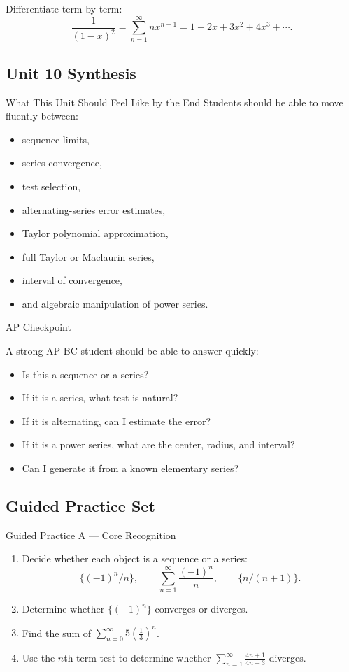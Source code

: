 \documentclass[11pt]{article}
\newcommand{\solution}{\noindent{\textbf{Solution.}}}
\newcommand{\apcheckpoint}[1]{%
\begin{skillbox}{AP Checkpoint}
#1
\end{skillbox}
}
\begin{document}
\solution
Differentiate term by term:
\[
\frac{1}{(1-x)^2}
=
\sum_{n=1}^{\infty}n x^{n-1}
=
1+2x+3x^2+4x^3+\cdots.
\]

\newpage
\subsection{Unit 10 Synthesis}

\begin{theorybox}{What This Unit Should Feel Like by the End}
Students should be able to move fluently between:
\begin{itemize}
    \item sequence limits,
    \item series convergence,
    \item test selection,
    \item alternating-series error estimates,
    \item Taylor polynomial approximation,
    \item full Taylor or Maclaurin series,
    \item interval of convergence,
    \item and algebraic manipulation of power series.
\end{itemize}
\end{theorybox}

\apcheckpoint{
A strong AP BC student should be able to answer quickly:
\begin{itemize}
    \item Is this a sequence or a series?
    \item If it is a series, what test is natural?
    \item If it is alternating, can I estimate the error?
    \item If it is a power series, what are the center, radius, and interval?
    \item Can I generate it from a known elementary series?
\end{itemize}
}

\newpage
\subsection{Guided Practice Set}

\begin{practicebox}{Guided Practice A --- Core Recognition}
\begin{enumerate}
    \item Decide whether each object is a sequence or a series:
    \[
    \{(-1)^n/n\},\qquad \sum_{n=1}^{\infty}\frac{(-1)^n}{n},\qquad \{n/(n+1)\}.
    \]
    \item Determine whether \(\{(-1)^n\}\) converges or diverges.
    \item Find the sum of \(\sum_{n=0}^{\infty}5\left(\frac13\right)^n\).
    \item Use the \(n\)th-term test to determine whether \(\sum_{n=1}^{\infty}\frac{4n+1}{4n-3}\) diverges.
\end{enumerate}
\end{practicebox}
\end{document}

